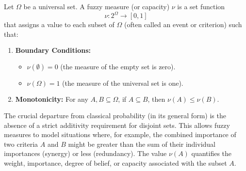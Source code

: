 \begin{definition}
Let $\Omega$ be a universal set. A fuzzy measure (or capacity) $\nu$ is a set function
\[ \nu: 2^\Omega \to [0, 1] \]
that assigns a value to each subset of $\Omega$ (often called an event or criterion) such that:
\begin{enumerate}
    \item \textbf{Boundary Conditions:}
    \begin{itemize}
        \item $\nu(\emptyset) = 0$ (the measure of the empty set is zero).
        \item $\nu(\Omega) = 1$ (the measure of the universal set is one).
    \end{itemize}
    \item \textbf{Monotonicity:} For any $A, B \subseteq \Omega$, if $A \subseteq B$, then $\nu(A) \le \nu(B)$.
\end{enumerate}
\end{definition}

The crucial departure from classical probability (in its general form) is the absence of a strict additivity requirement for disjoint sets. This allows fuzzy measures to model situations where, for example, the combined importance of two criteria $A$ and $B$ might be greater than the sum of their individual importances (synergy) or less (redundancy). The value $\nu(A)$ quantifies the weight, importance, degree of belief, or capacity associated with the subset $A$.

